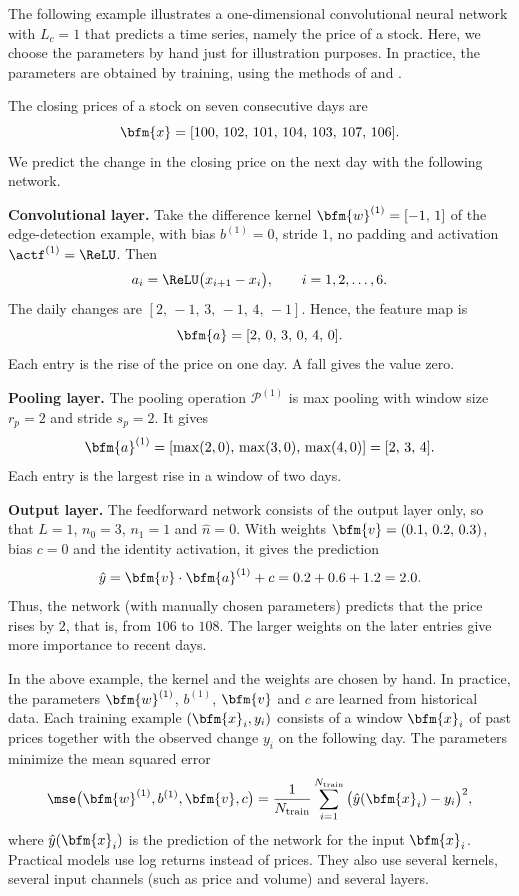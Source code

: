 The following example illustrates a one-dimensional convolutional neural network with $L_c = 1$ that predicts a time series, namely the price of a stock. Here, we choose the parameters by hand just for illustration purposes. In practice, the parameters are obtained by training, using the methods of  and .
\begin{example}
The closing prices of a stock on seven consecutive days are
$$
\bfm{x} = [100,\, 102,\, 101,\, 104,\, 103,\, 107,\, 106].
$$
We predict the change in the closing price on the next day with the following network.

\textbf{Convolutional layer.} Take the difference kernel $\bfm{w}^{(1)}=[-1,\,1]$ of the edge-detection example, with bias $b^{(1)}=0$, stride $1$, no padding and activation $\actf^{(1)} = \ReLU$. Then
$$
a_i = \ReLU\big(x_{i+1}-x_i\big),\qquad i=1,2,\ldots,6.
$$
The daily changes are $[2,\,-1,\,3,\,-1,\,4,\,-1]$. Hence, the feature map is
$$
\bfm{a} = [2,\, 0,\, 3,\, 0,\, 4,\, 0].
$$
Each entry is the rise of the price on one day. A fall gives the value zero.

\textbf{Pooling layer.} The pooling operation $\mathcal{P}^{(1)}$ is max pooling with window size $r_p=2$ and stride $s_p=2$. It gives
$$
\bfm{a}^{(1)} = [\max(2,0),\, \max(3,0),\, \max(4,0)] = [2,\, 3,\, 4].
$$
Each entry is the largest rise in a window of two days.

\textbf{Output layer.} The feedforward network consists of the output layer only, so that $L = 1$, $n_0 = 3$, $n_1 = 1$ and $\hat{n} = 0$. With weights $\bfm{v}=(0.1,\, 0.2,\, 0.3)$, bias $c=0$ and the identity activation, it gives the prediction
$$
\hat{y} = \bfm{v}\cdot\bfm{a}^{(1)} + c = 0.2 + 0.6 + 1.2 = 2.0.
$$
Thus, the network (with manually chosen parameters) predicts that the price rises by $2$, that is, from $106$ to $108$. The larger weights on the later entries give more importance to recent days.
\end{example}
\begin{remark}
In the above example, the kernel and the weights are chosen by hand. In practice, the parameters $\bfm{w}^{(1)}$, $b^{(1)}$, $\bfm{v}$ and $c$ are learned from historical data. Each training example $(\bfm{x}_i, y_i)$ consists of a window $\bfm{x}_i$ of past prices together with the observed change $y_i$ on the following day. The parameters minimize the mean squared error
$$
\mse\big(\bfm{w}^{(1)}, b^{(1)}, \bfm{v}, c\big) = \frac{1}{N_{\rm train}}\sum_{i=1}^{N_{\rm train}} \big(\hat{y}(\bfm{x}_i) - y_i\big)^2,
$$
where $\hat{y}(\bfm{x}_i)$ is the prediction of the network for the input $\bfm{x}_i$.
Practical models use log returns instead of prices. They also use several kernels, several input channels (such as price and volume) and several layers. 
\end{remark}


